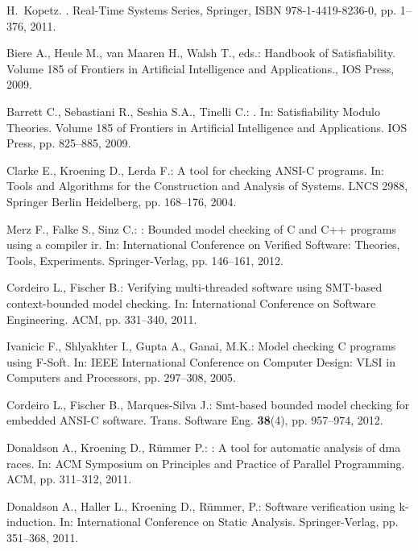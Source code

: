 \documentclass{acm_sen_article}
\begin{document}
\begin{thebibliography}{1}

H.~Kopetz.
.
\newblock Real-Time Systems Series, Springer, ISBN 978-1-4419-8236-0, pp. 1--376, 2011.

Biere A., Heule M., van Maaren H., Walsh T., eds.:
\newblock Handbook of Satisfiability.
\newblock Volume 185 of Frontiers in Artificial Intelligence and Applications., {IOS} Press, 2009.

Barrett C., Sebastiani R., Seshia S.A., Tinelli C.:
.
\newblock In: Satisfiability Modulo Theories. Volume 185 of Frontiers in
  Artificial Intelligence and Applications. IOS Press, pp. 825--885, 2009.

Clarke E., Kroening D., Lerda F.:
\newblock A tool for checking {ANSI-C} programs.
\newblock In: Tools and Algorithms for the Construction and Analysis of Systems. LNCS 2988, Springer Berlin Heidelberg,  pp. 168--176, 2004.

Merz F., Falke S., Sinz C.:
: Bounded model checking of {C} and {C++} programs using a
  compiler ir.
\newblock In: International Conference on Verified Software: Theories, Tools, Experiments. Springer-Verlag, pp. 146--161, 2012.

Cordeiro L., Fischer B.:
\newblock Verifying multi-threaded software using {SMT}-based context-bounded
  model checking.
\newblock In: International Conference on Software Engineering. ACM,  pp. 331--340, 2011.

Ivanicic F., Shlyakhter I., Gupta A., Ganai, M.K.:
\newblock Model checking {C} programs using {F-Soft}.
\newblock In: IEEE International Conference on Computer Design: VLSI in Computers and Processors, pp. 297--308, 2005.

Cordeiro L., Fischer B., Marques{-}Silva J.:
\newblock Smt-based bounded model checking for embedded {ANSI-C} software.
 Trans. Software Eng. \textbf{38}(4), pp. 957--974, 2012.

Donaldson A., Kroening D., R{\"{u}}mmer P.:
: A tool for automatic analysis of dma races.
\newblock In: ACM Symposium on Principles and Practice of Parallel Programming. ACM, pp. 311--312, 2011.

Donaldson A., Haller L., Kroening D., R{\"{u}}mmer, P.:
\newblock Software verification using k-induction.
\newblock In: International Conference on Static Analysis. Springer-Verlag, pp. 351--368, 2011.


\end{thebibliography}
\end{document}
